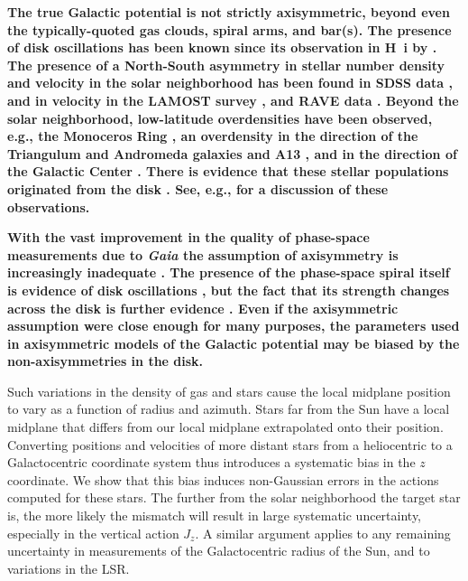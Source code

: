 \documentclass[twocolumn]{aastex62}
\begin{document}
\textbf{The true Galactic potential is not strictly axisymmetric, beyond even
the typically-quoted gas clouds, spiral arms, and bar(s). The presence of disk
oscillations has been known
    since its observation in H~{\sc i} by \citet{1957AJ.....62...93K}.
The presence of a North-South
asymmetry in stellar number density and velocity in the solar neighborhood has
been found in
SDSS data \citep{2012ApJ...750L..41W}, and in velocity in the
LAMOST survey \citep{2013ApJ...777L...5C, 2015ApJ...801..105X}, and RAVE data
\citep{2013MNRAS.436..101W}. Beyond the solar neighborhood, low-latitude
overdensities have been observed, e.g., the Monoceros Ring
\citep{2002ApJ...569..245N, 2003MNRAS.340L..21I, 2003ApJ...594L.119C,
2014ApJ...791....9S, 2016ApJ...825..140M}, an overdensity in the direction of
the Triangulum and Andromeda galaxies \citep{2007ApJ...668L.123M,
2014ApJ...793...62S, 2015ApJ...801..105X, 2015MNRAS.452..676P} and A13
\citep{2010ApJ...722..750S, 2017ApJ...844...74L}, and in the direction of the
Galactic Center \citep{2014Natur.509..342F}. There is evidence that these
stellar populations originated from the disk \citep{2015MNRAS.452..676P, 2018ApJ...854...47S,
2018Natur.555..334B}. See, e.g., \citet{2018MNRAS.481..286L} for a discussion
of these observations.}

\textbf{With the vast improvement in the quality of phase-space measurements
due to \textit{Gaia} the assumption of axisymmetry is increasingly inadequate
\citep[e.g.,][]{2018Natur.561..360A, 2019MNRAS.485.3134L}. The presence of the
phase-space spiral itself is evidence of disk oscillations
\citep{2018Natur.561..360A}, but the fact that its strength changes across the
disk is further evidence \citep{2019MNRAS.485.3134L, 2019MNRAS.486.1167B}. Even if the axisymmetric
assumption were close enough for many purposes, the parameters used in
axisymmetric models of the Galactic potential may be biased by the non-axisymmetries in the disk.}

Such
variations in the density of gas and stars cause the local
midplane position to vary as a function of radius and azimuth. Stars far from
the Sun have a local midplane that differs from our local midplane
extrapolated onto their position. Converting positions and velocities of more
distant stars from a heliocentric to a Galactocentric coordinate system thus
introduces a systematic bias in the $z$ coordinate. We show that this bias
induces non-Gaussian errors in the actions computed for these stars. The
further from the solar neighborhood the target star is, the more likely the
mismatch will result in large systematic uncertainty, especially in the
vertical action $J_z$. A similar argument applies to any remaining uncertainty
in measurements of the Galactocentric radius of the Sun, and to variations in
the LSR.
\end{document}
